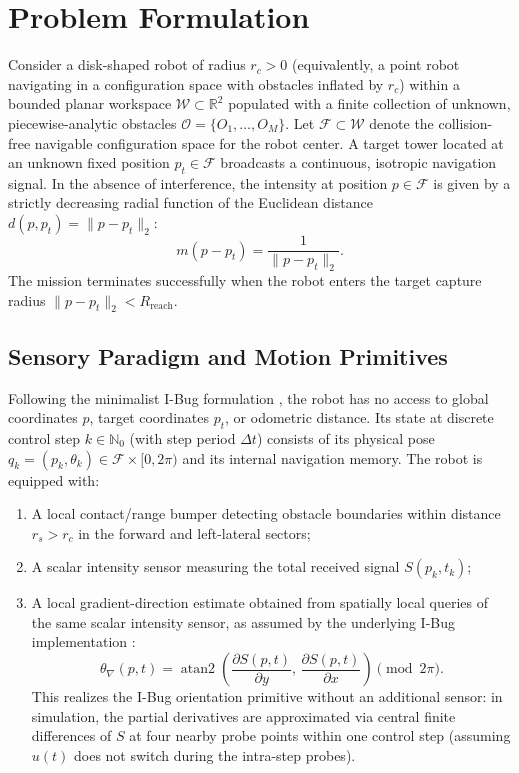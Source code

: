 \documentclass[12pt, a4paper]{article}
\begin{document}
\section{Problem Formulation}
\label{sec:formulation}
Consider a disk-shaped robot of radius $r_c > 0$ (equivalently, a point robot navigating in a configuration space with obstacles inflated by $r_c$) within a bounded planar workspace $\mathcal{W} \subset \mathbb{R}^2$ populated with a finite collection of unknown, piecewise-analytic obstacles $\mathcal{O} = \{O_1, \dots, O_M\}$. Let $\mathcal{F} \subset \mathcal{W}$ denote the collision-free navigable configuration space for the robot center. A target tower located at an unknown fixed position $p_t \in \mathcal{F}$ broadcasts a continuous, isotropic navigation signal. In the absence of interference, the intensity at position $p \in \mathcal{F}$ is given by a strictly decreasing radial function of the Euclidean distance $d(p, p_t) = \|p - p_t\|_2$:
\begin{equation}
    m(p - p_t) = \frac{1}{\|p - p_t\|_2}.
    \label{eq:target_field}
\end{equation}
The mission terminates successfully when the robot enters the target capture radius $\|p - p_t\|_2 < R_{\text{reach}}$.

\subsection{Sensory Paradigm and Motion Primitives}
Following the minimalist I-Bug formulation \cite{taylor2014intensity}, the robot has no access to global coordinates $p$, target coordinates $p_t$, or odometric distance. Its state at discrete control step $k \in \mathbb{N}_0$ (with step period $\Delta t$) consists of its physical pose $q_k = (p_k, \theta_k) \in \mathcal{F} \times [0, 2\pi)$ and its internal navigation memory. The robot is equipped with:
\begin{enumerate}
    \item A local contact/range bumper detecting obstacle boundaries within distance $r_s > r_c$ in the forward and left-lateral sectors;
    \item A scalar intensity sensor measuring the total received signal $S(p_k, t_k)$;
    \item A local gradient-direction estimate obtained from spatially local queries of the same scalar intensity sensor, as assumed by the underlying I-Bug implementation \cite{taylor2014intensity}:
    \begin{equation}
        \theta_{\nabla}(p, t) = \operatorname{atan2}\!\left(\frac{\partial S(p, t)}{\partial y},\, \frac{\partial S(p, t)}{\partial x}\right) \pmod{2\pi}.
        \label{eq:gradient_angle}
    \end{equation}
    This realizes the I-Bug orientation primitive without an additional sensor: in simulation, the partial derivatives are approximated via central finite differences of $S$ at four nearby probe points within one control step (assuming $u(t)$ does not switch during the intra-step probes).
\end{enumerate}
\end{document}
